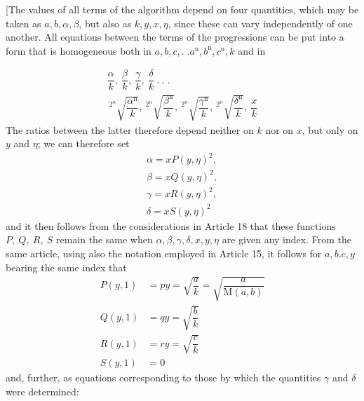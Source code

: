 [The values of all terms of the algorithm depend on four quantities, which may be taken as $a,\allowbreak b,\allowbreak \alpha,\allowbreak \beta$, but also as $k,\allowbreak y,\allowbreak x,\allowbreak \eta$, since these can vary independently of one another. All equations between the terms of the progressions can be put into a form that is homogeneous both in $a,\allowbreak b,\allowbreak c,\allowbreak .\;. a^{\mathrm n},\allowbreak b^{\mathrm n},\allowbreak c^{\mathrm n},\allowbreak k$ and in



\[
\begin{gathered}\dfrac{\alpha}{k},\ \dfrac{\beta}{k},\ \dfrac{\gamma}{k},\ \dfrac{\delta}{k}\ .\;.\;.\\[8pt]\
{}^{2^n}\!\surd {\dfrac{\alpha^{\mathrm n}}{k}},\
{}^{2^n}\!\surd {\dfrac{\beta^{\mathrm n}}{k}},\
{}^{2^n}\!\surd {\dfrac{\gamma^{\mathrm n}}{k}},\
{}^{2^n}\!\surd {\dfrac{\delta^{\mathrm n}}{k}},\ \dfrac{x}{k}\end{gathered}
\]
The ratios between the latter therefore depend neither on $k$ nor on $x$, but only on $y$ and $\eta$; we can therefore set
\Needspace{14\baselineskip}
\[
\begin{gathered}\alpha=x P(y,\eta)^2,\\[5pt]
\beta=x Q(y,\eta)^2,\\[5pt]
\gamma=x R(y,\eta)^2,\\[5pt]
\delta=x S(y,\eta)^2\end{gathered}
\]
and it then follows from the considerations in Article 18 that these functions $P,\allowbreak \ Q,\allowbreak \ R,\allowbreak \ S$ remain the same when $\alpha,\allowbreak \beta,\allowbreak \gamma,\allowbreak \delta,\allowbreak x,\allowbreak y,\allowbreak \eta$ are given any index. 
From the same article, using also the notation employed in Article 15, it follows for $a,\allowbreak b. c,\allowbreak y$ bearing the same index that
\[
\begin{aligned}
P(y,1)&=py=\surd {\dfrac ak}=\surd {\dfrac a{\mathrm M(a,b)}}\\
Q(y,1)&=qy=\surd {\dfrac bk}\\
R(y,1)&=ry=\surd {\dfrac ck}\\
S(y,1)&=0
\end{aligned}
\]
and, further, as equations corresponding to those by which the quantities $\gamma$ and $\delta$ were determined:
